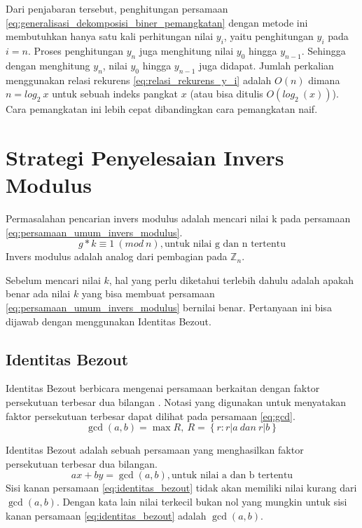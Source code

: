 Dari penjabaran tersebut, penghitungan persamaan \eqref{eq:generalisasi_dekomposisi_biner_pemangkatan} dengan metode ini membutuhkan hanya satu kali perhitungan nilai $ y_i $, yaitu penghitungan $ y_i $ pada $ i=n $. Proses penghitungan $ y_n $ juga menghitung nilai $ y_0 $ hingga $ y_{n-1} $. Sehingga dengan menghitung $ y_n $, nilai $ y_0 $ hingga $ y_{n-1} $ juga didapat. Jumlah perkalian menggunakan relasi rekurens \eqref{eq:relasi_rekurens_y_i} adalah $ O(n) $ dimana $ n=log_2\ x$ untuk sebuah indeks pangkat $ x $ (atau bisa ditulis $ O\left(log_2\ (x)\right) $). Cara pemangkatan ini lebih cepat dibandingkan cara pemangkatan naif.

\section{Strategi Penyelesaian Invers Modulus}

Permasalahan pencarian invers modulus adalah mencari nilai k pada persamaan \eqref{eq:persamaan_umum_invers_modulus}.
\begin{equation}
g*k \equiv 1\ (mod\ n), \text{untuk nilai g dan n tertentu}
\label{eq:persamaan_umum_invers_modulus}
\end{equation}
Invers modulus adalah analog dari pembagian pada $ \mathbb{Z}_n $.

Sebelum mencari nilai $ k $, hal yang perlu diketahui terlebih dahulu adalah apakah benar ada nilai $ k $ yang bisa membuat persamaan \eqref{eq:persamaan_umum_invers_modulus} bernilai benar. Pertanyaan ini bisa dijawab dengan menggunakan Identitas Bezout.

\subsection{Identitas Bezout}

Identitas Bezout berbicara mengenai persamaan berkaitan dengan faktor persekutuan terbesar dua bilangan \cite{brilliant_bezout}. Notasi yang digunakan untuk menyatakan faktor persekutuan terbesar dapat dilihat pada persamaan \eqref{eq:gcd}.
\begin{equation}
\gcd⁡(a,b)=\max R,\ R=\left\{r:r|a\ dan\ r|b\right\}
\label{eq:gcd}
\end{equation}

Identitas Bezout adalah sebuah persamaan yang menghasilkan faktor persekutuan terbesar dua bilangan.
\begin{equation}
ax+by=\gcd(a,b), \text{untuk nilai a dan b tertentu}
\label{eq:identitas_bezout}
\end{equation}
Sisi kanan persamaan \eqref{eq:identitas_bezout} tidak akan memiliki nilai kurang dari $ \gcd (a,b) $. Dengan kata lain nilai terkecil bukan nol yang mungkin untuk sisi kanan persamaan \eqref{eq:identitas_bezout} adalah $ \gcd (a,b) $.

